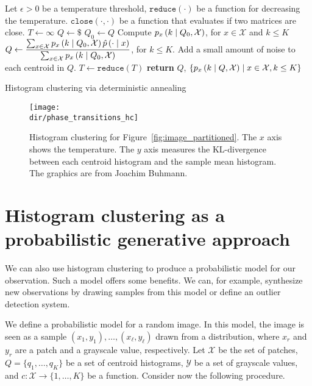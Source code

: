 \begin{algorithm}
\begin{algorithmic}[1]
\State Let
\State \qquad $\epsilon > 0$ be a temperature threshold,
\State \qquad $\texttt{reduce}(\cdot)$ be a function for decreasing the temperature.
\State \qquad $\texttt{close}\left(\cdot, \cdot\right)$ be a function that evaluates if two matrices are close.
\State $T \gets \infty$ 
\State $Q \gets \$$ 
\Repeat
\State $Q_0 \gets Q$
\State Compute $p_{x} \left(k\mid Q_0, \mathcal{X}\right)$, for $x \in \mathcal{X}$ and $k \leq K$
\State $\displaystyle Q \gets \frac{\sum_{x \in \mathcal{X}} p_{x} \left(k\mid Q_0, \mathcal{X}\right) \hat{p}\left(\cdot \mid x\right)}{\sum_{x \in \mathcal{X}} p_{x} \left(k\mid Q_0, \mathcal{X}\right)}$, for $k \leq K$.
\State Add a small amount of noise to each centroid in $Q$.
\State $T \gets \texttt{reduce}(T)$
\EndWhile
\State \textbf{return} $Q$, $\{p_{x} \left(k\mid Q, \mathcal{X}\right) \mid x \in \mathcal{X}, k \leq K\}$
\EndFunction
\end{algorithmic}
\caption{Histogram clustering via deterministic annealing}
\label{algo:histo_cluster}
\end{algorithm}

\begin{figure}[hbtp]
\centering
\texttt{[image: \\dir/phase\_transitions\_hc]}
\caption{Histogram clustering for Figure~\ref{fig:image_partitioned}. The $x$ axis shows the temperature. The $y$ axis measures the KL-divergence between each centroid histogram and the sample mean histogram. The graphics are from Joachim Buhmann.}
\label{fig:phase_transitions_hc}
\end{figure}

\section{Histogram clustering as a probabilistic generative approach}

We can also use histogram clustering to produce a probabilistic model for
our observation. Such a model offers some benefits. We can, for example,
synthesize new observations by drawing samples from this model or define
an outlier detection system.

We define a probabilistic model for a random image. In this model, the
image is seen as a sample $(x_1, y_1), \ldots, (x_\ell, y_\ell)$ drawn from a distribution,
where $x_r$ and $y_r$ are a patch and a grayscale value, respectively. Let $\mathcal{X}$ be
the set of patches, $Q = \{q_1, \ldots, q_K\}$ be a set of centroid histograms, $\mathcal{Y}$ be
a set of grayscale values, and $c: \mathcal{X} \to \{1,\ldots, K\}$ be a function. Consider
now the following procedure.

